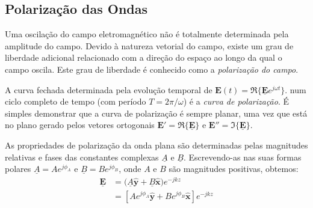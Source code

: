 \subsection{Polarização das Ondas}

Uma oscilação do campo eletromagnético não é totalmente determinada pela amplitude do campo. Devido à natureza vetorial do campo, existe um grau de liberdade adicional relacionado com a direção do espaço ao longo da qual o campo oscila. Este grau de liberdade é conhecido como a \emph{polarização do campo}.

A curva fechada determinada pela evolução temporal de $\mathbf{E}(t) = \Re\{ \mathbf{\underline{E}}e^{j\omega t} \}$. num ciclo completo de tempo (com período $T = 2\pi / \omega$) é a \emph{curva de polarização}. É simples demonstrar que a curva de polarização é sempre planar, uma vez que está no plano gerado pelos vetores ortogonais $\mathbf{E'} = \Re\{ \mathbf{\underline{E}} \}$ e $\mathbf{E''} = \Im\{ \mathbf{\underline{E}} \}$.

As propriedades de polarização da onda plana são determinadas pelas magnitudes relativas e fases das constantes complexas $\underline{A}$ e $\underline{B}$. Escrevendo-as nas suas formas polares $\underline{A} = A e^{j\phi_A}$ e $\underline{B} = B e^{j\phi_B}$, onde $A$ e $B$ são magnitudes positivas, obtemos:
\begin{equation}
    \begin{aligned}
        \mathbf{\underline{E}} &= \bigl(\underline{A} \mathbf{\hat{y}} + \underline{B} \mathbf{\hat{x}}\bigl)e^{-jkz}\\
        &= \left[A e^{j\phi_A}\mathbf{\hat{y}} + B e^{j\phi_B}\mathbf{\hat{x}}\right]e^{-jkz}
    \end{aligned}
\end{equation}

